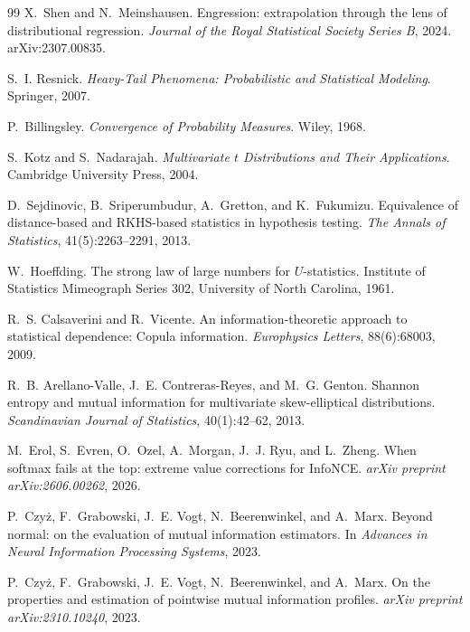 \documentclass[11pt]{article}
\theoremstyle{plain}
\theoremstyle{definition}
\theoremstyle{remark}
\begin{document}
\begin{thebibliography}{99}
X.~Shen and N.~Meinshausen.
\newblock Engression: extrapolation through the lens of distributional
 regression.
\newblock \emph{Journal of the Royal Statistical Society Series B}, 2024.
 arXiv:2307.00835.

S.~I. Resnick.
\newblock \emph{Heavy-Tail Phenomena: Probabilistic and Statistical Modeling}.
\newblock Springer, 2007.

P.~Billingsley.
\newblock \emph{Convergence of Probability Measures}.
\newblock Wiley, 1968.

S.~Kotz and S.~Nadarajah.
\newblock \emph{Multivariate $t$ Distributions and Their Applications}.
\newblock Cambridge University Press, 2004.

D.~Sejdinovic, B.~Sriperumbudur, A.~Gretton, and K.~Fukumizu.
\newblock Equivalence of distance-based and RKHS-based statistics in
 hypothesis testing.
\newblock \emph{The Annals of Statistics}, 41(5):2263--2291, 2013.

W.~Hoeffding.
\newblock The strong law of large numbers for $U$-statistics.
\newblock Institute of Statistics Mimeograph Series 302, University of North
 Carolina, 1961.

R.~S. Calsaverini and R.~Vicente.
\newblock An information-theoretic approach to statistical dependence: Copula
 information.
\newblock \emph{Europhysics Letters}, 88(6):68003, 2009.

R.~B. Arellano-Valle, J.~E. Contreras-Reyes, and M.~G. Genton.
\newblock Shannon entropy and mutual information for multivariate
 skew-elliptical distributions.
\newblock \emph{Scandinavian Journal of Statistics}, 40(1):42--62, 2013.

M.~Erol, S.~Evren, O.~Ozel, A.~Morgan, J.~J. Ryu, and L.~Zheng.
\newblock When softmax fails at the top: extreme value corrections for
 {InfoNCE}.
\newblock \emph{arXiv preprint arXiv:2606.00262}, 2026.

P.~Czy\.z, F.~Grabowski, J.~E. Vogt, N.~Beerenwinkel, and A.~Marx.
\newblock Beyond normal: on the evaluation of mutual information estimators.
\newblock In \emph{Advances in Neural Information Processing Systems}, 2023.

P.~Czy\.z, F.~Grabowski, J.~E. Vogt, N.~Beerenwinkel, and A.~Marx.
\newblock On the properties and estimation of pointwise mutual information
 profiles.
\newblock \emph{arXiv preprint arXiv:2310.10240}, 2023.


\end{thebibliography}
\end{document}
